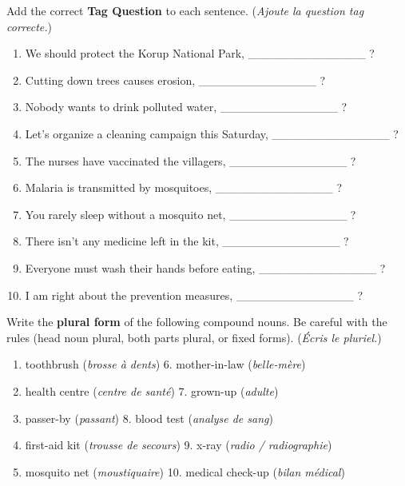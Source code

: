 \documentclass[11pt]{article}
\begin{document}
\begin{exercice}
Add the correct \textbf{Tag Question} to each sentence. (\emph{Ajoute la question tag correcte.})
\begin{enumerate}
    \item We should protect the Korup National Park, \_\_\_\_\_\_\_\_\_\_\_\_\_\_ ?
    \item Cutting down trees causes erosion, \_\_\_\_\_\_\_\_\_\_\_\_\_\_ ?
    \item Nobody wants to drink polluted water, \_\_\_\_\_\_\_\_\_\_\_\_\_\_ ?
    \item Let's organize a cleaning campaign this Saturday, \_\_\_\_\_\_\_\_\_\_\_\_\_\_ ?
    \item The nurses have vaccinated the villagers, \_\_\_\_\_\_\_\_\_\_\_\_\_\_ ?
    \item Malaria is transmitted by mosquitoes, \_\_\_\_\_\_\_\_\_\_\_\_\_\_ ?
    \item You rarely sleep without a mosquito net, \_\_\_\_\_\_\_\_\_\_\_\_\_\_ ?
    \item There isn't any medicine left in the kit, \_\_\_\_\_\_\_\_\_\_\_\_\_\_ ?
    \item Everyone must wash their hands before eating, \_\_\_\_\_\_\_\_\_\_\_\_\_\_ ?
    \item I am right about the prevention measures, \_\_\_\_\_\_\_\_\_\_\_\_\_\_ ?
\end{enumerate}
\end{exercice}

\begin{exercice}
Write the \textbf{plural form} of the following compound nouns. Be careful with the rules (head noun plural, both parts plural, or fixed forms). (\emph{Écris le pluriel.})
\begin{enumerate}
    \item toothbrush (\textit{brosse à dents}) \hfill 6. mother-in-law (\textit{belle-mère})
    \item health centre (\textit{centre de santé}) \hfill 7. grown-up (\textit{adulte})
    \item passer-by (\textit{passant}) \hfill 8. blood test (\textit{analyse de sang})
    \item first-aid kit (\textit{trousse de secours}) \hfill 9. x-ray (\textit{radio / radiographie})
    \item mosquito net (\textit{moustiquaire}) \hfill 10. medical check-up (\textit{bilan médical})
\end{enumerate}
\end{exercice}
\end{document}
